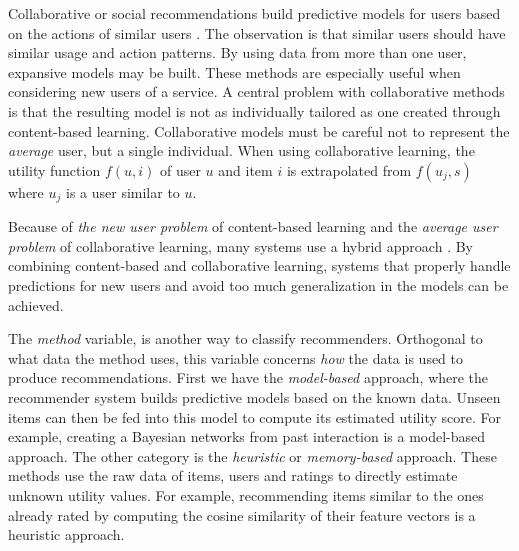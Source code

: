 Collaborative or social recommendations build predictive models for users based on the actions of similar users 
\citep{Schafer2007}.
The observation is that similar users should have similar usage and action patterns. 
By using data from more than one user, expansive models may be built. 
These methods are especially useful when considering new users of a service. 
A central problem with collaborative methods is that the resulting model is not as individually tailored as one created through content-based learning. 
Collaborative models must be careful not to represent the \emph{average} user, but a single individual.
When using collaborative learning, 
the utility function $f(u,i)$ of user $u$ and item $i$ is extrapolated from $f(u_j,s)$ where $u_j$ is a user similar to $u$. 

Because of \emph{the new user problem} of content-based learning and the \emph{average user problem} of collaborative learning, 
many systems use a hybrid approach \citep{Burke2007}.
By combining content-based and collaborative learning, 
systems that properly handle predictions for new users and avoid too much generalization in the models can be achieved. 

The \emph{method} variable, is another way to classify recommenders. Orthogonal to what data the method uses, this variable
concerns \emph{how} the data is used to produce recommendations.
First we have the \emph{model-based} approach, where the recommender system builds predictive models based on the known data. 
Unseen items can then be fed into this model to compute its estimated utility score. 
For example, creating a Bayesian networks from past interaction is a model-based approach.
The other category is the \emph{heuristic} or \emph{memory-based} approach. 
These methods use the raw data of items, users and ratings to directly estimate unknown utility values. 
For example, recommending items similar to the ones already rated by computing the cosine similarity of their feature vectors is a heuristic approach.





